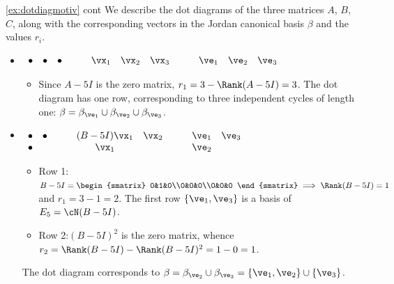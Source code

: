 \begin{example*}{\ref{ex:dotdiagmotiv} cont}{}
We describe the dot diagrams of the three matrices $A$, $B$, $C$, along with the corresponding vectors in the Jordan canonical basis $\beta$ and the values $r_i$.
\begin{itemize}
	\item[$A:$] $\begin{array}{lll}
		\bullet&\bullet&\bullet
		\end{array}
		\qquad
		\begin{array}{lll}
		\vx_1&\vx_2&\vx_3
		\end{array}
		\qquad
		\begin{array}{lll}
		\ve_1&\ve_2&\ve_3
		\end{array}$
		\begin{itemize}
		  \item[]\hspace*{-20pt}Since $A-5I$ is the zero matrix, $r_1=3-\Rank(A-5I)=3$. The dot diagram has one row, corresponding to three independent cycles of length one: $\beta=\beta_{\ve_1}\cup\beta_{\ve_2}\cup\beta_{\ve_3}$.
		\end{itemize}
		
	\item[$B:$] $\begin{array}[t]{ll}
		\bullet&\bullet\\
		\bullet&
		\end{array}
		\qquad
		\begin{array}[t]{cl}
		(B-5I)\vx_1&\vx_2\\
		\vx_1&
		\end{array}
		\qquad
		\begin{array}[t]{ll}
		\ve_1&\ve_3\\
		\ve_2
		\end{array}$
		\begin{itemize}
		  \item[]\hspace*{-20pt}Row 1:\quad $B-5I=\smash[t]{\begin{smatrix}
			0&1&0\\0&0&0\\0&0&0
		  \end{smatrix}}\implies \Rank(B-5I)=1$ and $r_1=3-1=2$. The first row $\{\ve_1,\ve_3\}$ is a basis of $E_5=\cN(B-5I)$.
			\item[]\hspace*{-20pt}Row 2:\quad $(B-5I)^2$ is the zero matrix, whence $r_2=\Rank(B-5I)-\Rank(B-5I)^2=1-0=1$.
		\end{itemize}
		The dot diagram corresponds to $\beta=\beta_{\ve_2}\cup\beta_{\ve_3}=\{\ve_1,\ve_2\}\cup\{\ve_3\}$.
		

\end{itemize}
\end{example*}

